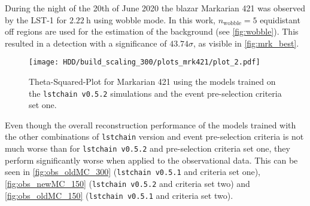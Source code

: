 During the night of the 20th of June 2020 the blazar Markarian 421 was observed by the LST-1 for $\SI{2.22}{\hour}$ using wobble mode.
In this work, $n_\text{wobble} = \num{5}$ equidistant off regions are used for the estimation of the background (see \autoref{fig:wobble}).
This resulted in a detection with a significance of $\num{43.74} \sigma$, as visible in \autoref{fig:mrk_best}.
\begin{figure}
    \centering
    \texttt{[image: HDD/build\_scaling\_300/plots\_mrk421/plot\_2.pdf]}
    \caption{Theta-Squared-Plot for Markarian 421 using the models trained on the \texttt{lstchain v0.5.2} simulations and the event pre-selection criteria set one.}
    \label{fig:mrk_best}
\end{figure}

Even though the overall reconstruction performance of the models trained with the other combinations of \texttt{lstchain} version and event pre-selection criteria
is not much worse than for \texttt{lstchain v0.5.2} and pre-selection criteria set one, they perform significantly worse when applied to the observational data.
This can be seen in \autoref{fig:obs_oldMC_300} (\texttt{lstchain v0.5.1} and criteria set one), \autoref{fig:obs_newMC_150} (\texttt{lstchain v0.5.2} and criteria set two)
and \autoref{fig:obs_oldMC_150} (\texttt{lstchain v0.5.1} and criteria set two).
